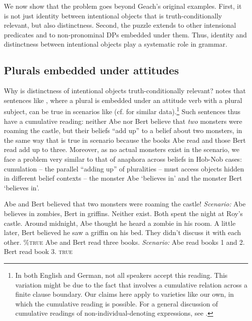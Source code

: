 \documentclass[output=paper]{langscibook}
\begin{document}
We now show that the problem goes beyond Geach's original examples. First, it is not just identity between intentional objects that is truth-conditionally relevant, but also distinctness. Second, the puzzle extends to other intensional predicates and to non-pronominal DPs embedded under them. Thus, identity and distinctness between intentional objects play a systematic role in grammar.

\subsection{Plurals embedded under attitudes}\label{sch-has:sec:2.1}

Why is distinctness of intentional objects truth-conditionally relevant? \citet{Schmitt:2019a} notes that sentences like , where a plural is embedded under an attitude verb with a plural subject, can be true in scenarios like   (cf. \citealt{Pasternak:2018a} for similar data).\footnote{In both English and German, not all speakers accept this reading. This variation might be due to the fact that  involves a cumulative relation across a finite clause boundary. Our claims here apply to varieties like our own, in which the cumulative reading is possible. For a general discussion of cumulative readings of non-individual-denoting expressions, see \citet{Schmitt:2019}.} Such sentences thus have a cumulative reading: neither Abe nor Bert believe that \textit{two} monsters were roaming the castle, but their beliefs ``add up'' to a belief about two monsters, in the same way that  is true in scenario  because the books Abe read and those Bert read add up to three. Moreover, as no actual monsters exist in the scenario, we face a problem very similar to that of anaphora across beliefs in Hob-Nob cases: cumulation -- the parallel ``adding up'' of pluralities -- must access objects hidden in different belief contexts -- the monster Abe `believes in' and the monster Bert `believes in'.

\eanoraggedright
\eanoraggedright \label{sch-has:ex:6} Abe and Bert  believed that two monsters were roaming the castle! %
  \ex\label{sch-has:ex:7} \textit{Scenario:} Abe believes in zombies, Bert in griffins. Neither exist. Both spent the night at Roy's castle.  Around midnight, Abe thought he heard a zombie in his room. A little later, Bert believed he saw a griffin  on his bed. They didn't discuss it with each other.  %
\hfill {} \textsc{\%true}
\z\ex
\ea \label{sch-has:ex:6a} Abe and Bert read three books. %
\ex \label{sch-has:ex:7a} \textit{Scenario:} Abe read books 1 and 2. Bert read book 3. \hfill {} \textsc{true} 
\z\z
\end{document}
